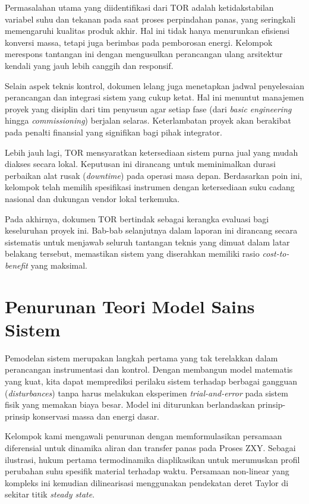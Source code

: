 \documentclass[12pt, a4paper]{report}
\begin{document}
Permasalahan utama yang diidentifikasi dari TOR adalah ketidakstabilan variabel suhu dan tekanan pada saat proses perpindahan panas, yang seringkali memengaruhi kualitas produk akhir. Hal ini tidak hanya menurunkan efisiensi konversi massa, tetapi juga berimbas pada pemborosan energi. Kelompok merespons tantangan ini dengan mengusulkan perancangan ulang arsitektur kendali yang jauh lebih canggih dan responsif.

Selain aspek teknis kontrol, dokumen lelang juga menetapkan jadwal penyelesaian perancangan dan integrasi sistem yang cukup ketat. Hal ini menuntut manajemen proyek yang disiplin dari tim penyusun agar setiap fase (dari \textit{basic engineering} hingga \textit{commissioning}) berjalan selaras. Keterlambatan proyek akan berakibat pada penalti finansial yang signifikan bagi pihak integrator.

Lebih jauh lagi, TOR mensyaratkan ketersediaan sistem purna jual yang mudah diakses secara lokal. Keputusan ini dirancang untuk meminimalkan durasi perbaikan alat rusak (\textit{downtime}) pada operasi masa depan. Berdasarkan poin ini, kelompok telah memilih spesifikasi instrumen dengan ketersediaan suku cadang nasional dan dukungan vendor lokal terkemuka.

Pada akhirnya, dokumen TOR bertindak sebagai kerangka evaluasi bagi keseluruhan proyek ini. Bab-bab selanjutnya dalam laporan ini dirancang secara sistematis untuk menjawab seluruh tantangan teknis yang dimuat dalam latar belakang tersebut, memastikan sistem yang diserahkan memiliki rasio \textit{cost-to-benefit} yang maksimal.

\section{Penurunan Teori Model Sains Sistem}
Pemodelan sistem merupakan langkah pertama yang tak terelakkan dalam perancangan instrumentasi dan kontrol. Dengan membangun model matematis yang kuat, kita dapat memprediksi perilaku sistem terhadap berbagai gangguan (\textit{disturbances}) tanpa harus melakukan eksperimen \textit{trial-and-error} pada sistem fisik yang memakan biaya besar. Model ini diturunkan berlandaskan prinsip-prinsip konservasi massa dan energi dasar.

Kelompok kami mengawali penurunan dengan memformulasikan persamaan diferensial untuk dinamika aliran dan transfer panas pada Proses ZXY. Sebagai ilustrasi, hukum pertama termodinamika diaplikasikan untuk merumuskan profil perubahan suhu spesifik material terhadap waktu. Persamaan non-linear yang kompleks ini kemudian dilinearisasi menggunakan pendekatan deret Taylor di sekitar titik \textit{steady state}.
\end{document}
